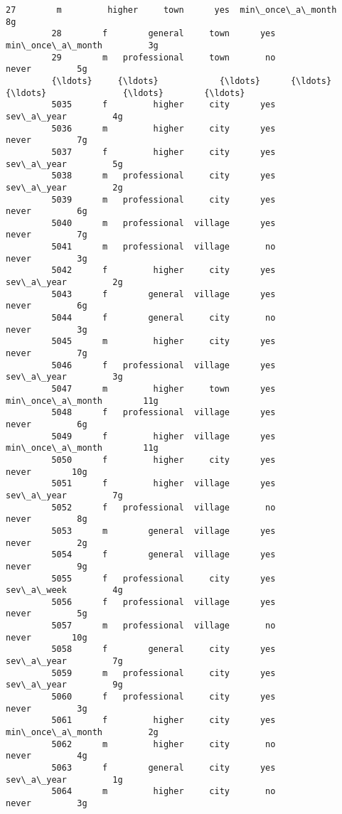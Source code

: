 \documentclass[11pt]{article}
\begin{document}
\begin{Verbatim}[commandchars=\\\{\}]
         27        m         higher     town      yes  min\_once\_a\_month         8g   
         28        f        general     town      yes  min\_once\_a\_month         3g   
         29        m   professional     town       no             never         5g   
         {\ldots}     {\ldots}            {\ldots}      {\ldots}      {\ldots}               {\ldots}        {\ldots}   
         5035      f         higher     city      yes        sev\_a\_year         4g   
         5036      m         higher     city      yes             never         7g   
         5037      f         higher     city      yes        sev\_a\_year         5g   
         5038      m   professional     city      yes        sev\_a\_year         2g   
         5039      m   professional     city      yes             never         6g   
         5040      m   professional  village      yes             never         7g   
         5041      m   professional  village       no             never         3g   
         5042      f         higher     city      yes        sev\_a\_year         2g   
         5043      f        general  village      yes             never         6g   
         5044      f        general     city       no             never         3g   
         5045      m         higher     city      yes             never         7g   
         5046      f   professional  village      yes        sev\_a\_year         3g   
         5047      m         higher     town      yes  min\_once\_a\_month        11g   
         5048      f   professional  village      yes             never         6g   
         5049      f         higher  village      yes  min\_once\_a\_month        11g   
         5050      f         higher     city      yes             never        10g   
         5051      f         higher  village      yes        sev\_a\_year         7g   
         5052      f   professional  village       no             never         8g   
         5053      m        general  village      yes             never         2g   
         5054      f        general  village      yes             never         9g   
         5055      f   professional     city      yes        sev\_a\_week         4g   
         5056      f   professional  village      yes             never         5g   
         5057      m   professional  village       no             never        10g   
         5058      f        general     city      yes        sev\_a\_year         7g   
         5059      m   professional     city      yes        sev\_a\_year         9g   
         5060      f   professional     city      yes             never         3g   
         5061      f         higher     city      yes  min\_once\_a\_month         2g   
         5062      m         higher     city       no             never         4g   
         5063      f        general     city      yes        sev\_a\_year         1g   
         5064      m         higher     city       no             never         3g   
         

\end{Verbatim}
\end{document}
